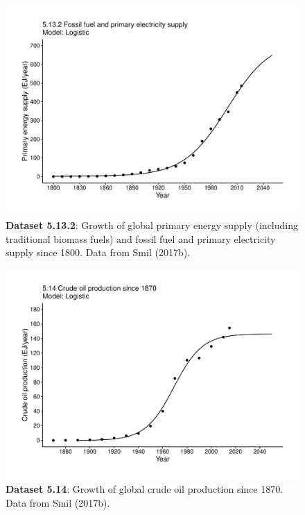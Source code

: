 \documentclass[aps,rmp,preprint,superscriptaddress,10pt,onecolumn]{article}
\begin{document}
\clearpage
\begin{figure}[h]
\includegraphics[width=\textwidth]{output/figs-ggplot/5.13.2.pdf}
\caption{\textbf{Dataset 5.13.2}: Growth of global primary energy supply (including traditional biomass fuels) and fossil fuel and primary electricity supply since 1800. Data from Smil (2017b). }
\end{figure}
	
\clearpage
\begin{figure}[h]
\includegraphics[width=\textwidth]{output/figs-ggplot/5.14.pdf}
\caption{\textbf{Dataset 5.14}: Growth of global crude oil production since 1870. Data from Smil (2017b).}
\end{figure}
	
\end{document}
